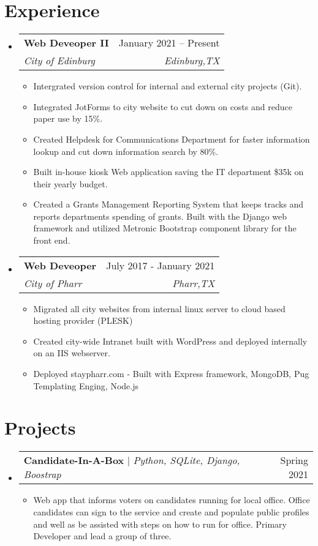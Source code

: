 \documentclass[letterpaper,11pt]{article}
\makeatletter
\newcommand{\resumeItem}[1]{
  \item\small{
    {#1 \vspace{-2pt}}
  }
}
\newcommand{\resumeSubheading}[4]{
  \vspace{-2pt}\item
    \begin{tabular*}{0.97\textwidth}[t]{l@{\extracolsep{\fill}}r}
      \textbf{#1} & #2 \\
      \textit{\small#3} & \textit{\small #4} \\
    \end{tabular*}\vspace{-7pt}
}
\newcommand{\resumeProjectHeading}[2]{
    \item
    \begin{tabular*}{0.97\textwidth}{l@{\extracolsep{\fill}}r}
      \small#1 & #2 \\
    \end{tabular*}\vspace{-7pt}
}
\newcommand{\resumeSubHeadingListStart}{\begin{itemize}[leftmargin=0.15in, label={}]}
\newcommand{\resumeSubHeadingListEnd}{\end{itemize}}
\newcommand{\resumeItemListStart}{\begin{itemize}}
\newcommand{\resumeItemListEnd}{\end{itemize}\vspace{-5pt}}
\makeatother
\begin{document}
\section{Experience}
  \resumeSubHeadingListStart
    \resumeSubheading
      {Web Deveoper II}{January 2021 -- Present}
      {City of Edinburg}{Edinburg,TX}
      \resumeItemListStart
        \resumeItem {Intergrated version control for internal and external city projects (Git).}
        \resumeItem {Integrated JotForms to city website to cut down on costs and reduce paper use by 15\%.}  
        \resumeItem {Created Helpdesk for Communications Department for faster information lookup and cut down information search by 80\%.} 
        \resumeItem {Built in-house kiosk Web application saving the IT department \$35k on their yearly budget.} 
        \resumeItem {Created a Grants Management Reporting System that keeps tracks and reports departments spending of grants. Built with the Django web framework and utilized Metronic Bootstrap component library for the front end. \\}
      \resumeItemListEnd
    \resumeSubheading
      {Web Deveoper }{July 2017 - January 2021}
      {City of Pharr}{Pharr,TX}
      \resumeItemListStart
        \resumeItem {Migrated all city websites from internal linux server to cloud based hosting provider (PLESK)}
        \resumeItem { Created city-wide Intranet built with WordPress and deployed internally on an IIS webserver.}
        \resumeItem {Deployed staypharr.com - Built with Express framework, MongoDB, Pug Templating Enging, Node.js} 
      \resumeItemListEnd
  \resumeSubHeadingListEnd
%
%
\section{Projects}
    \resumeSubHeadingListStart
      \resumeProjectHeading
          {\textbf{Candidate-In-A-Box} $|$ \emph{Python, SQLite, Django, Boostrap}}{Spring 2021}
          \resumeItemListStart
            \resumeItem{Web app that informs voters on candidates running for local office. Office candidates can sign to the service and create and populate public profiles and well as be assisted with steps on how to run for office. Primary Developer and lead a group of three. }
          \resumeItemListEnd

    \resumeSubHeadingListEnd
\end{document}

